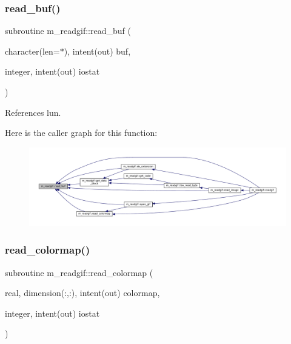 \subsubsection{\texorpdfstring{read\+\_\+buf()}{read\_buf()}}
{\footnotesize\ttfamily subroutine m\+\_\+readgif\+::read\+\_\+buf (\begin{DoxyParamCaption}\item[{character(len=$\ast$), intent(out)}]{buf,  }\item[{integer, intent(out)}]{iostat }\end{DoxyParamCaption})\hspace{0.3cm}{\ttfamily [private]}}



References lun.

Here is the caller graph for this function\+:
\nopagebreak
\begin{figure}[H]
\begin{center}
\leavevmode
\includegraphics[width=350pt]{namespacem__readgif_a272a4dbcc1419d3d103db4c50b757805_icgraph}
\end{center}
\end{figure}
\mbox{\label{namespacem__readgif_aabaf13dcb1e665b2524049e5661ca4b6}} 
\subsubsection{\texorpdfstring{read\+\_\+colormap()}{read\_colormap()}}
{\footnotesize\ttfamily subroutine m\+\_\+readgif\+::read\+\_\+colormap (\begin{DoxyParamCaption}\item[{real, dimension(\+:,\+:), intent(out)}]{colormap,  }\item[{integer, intent(out)}]{iostat }\end{DoxyParamCaption})\hspace{0.3cm}{\ttfamily [private]}}




